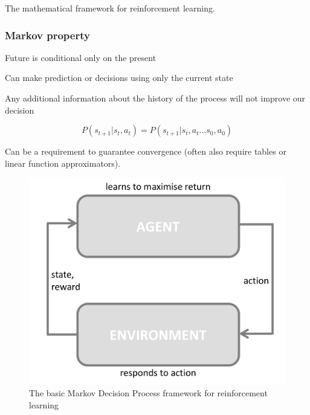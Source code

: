 \documentclass[]{article}
\begin{document}
The mathematical framework for reinforcement learning.

\hypertarget{markov-property}{%
\subsubsection{Markov property}\label{markov-property}}

Future is conditional only on the present

Can make prediction or decisions using only the current state

Any additional information about the history of the process will not
improve our decision

\[ P(s_{t+1} | s_{t}, a_{t}) = P(s_{t+1}|s_t, a_t...s_0, a_0)\]

Can be a requirement to guarantee convergence (often also require tables
or linear function approximators).

\begin{figure}
\centering
\includegraphics[width=\textwidth,height=0.2\textheight]{./tex2pdf.-4c1708fb449e9e84/5c97f063036ae7d1380a3d9d280f30b5101b81b9.png}
\caption{The basic Markov Decision Process framework for reinforcement
learning}
\end{figure}
\end{document}
